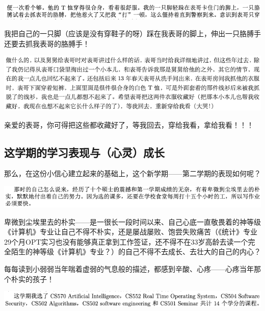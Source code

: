 \documentclass[9pt, b5paper]{article}
\begin{document}
\begin{center}
\includegraphics[width=.9\linewidth]{./pic/backups_plans_20210502_113101.png}
\end{center}

我把自己的一只脚（应该是没有穿鞋子的呀）踩在我表哥的脚上，伸出一只胳膊手还要去抓我表哥的胳膊手！

\begin{center}
\includegraphics[width=.9\linewidth]{./pic/backups_plans_20210502_104225.png}
\end{center}

亲爱的表哥，你可得把这些都收藏好了，等我回去，穿给我看，拿给我看！！！

\subsection{这学期的学习表现与（心灵）成长}
\label{sec:org8c208ae}

那么，在这份小信心建立起来的基础上，这个新学期——第二学期的表现如何呢？

\begin{center}
\includegraphics[width=.9\linewidth]{./pic/backups_plans_20210424_214439.png}
\end{center}

卑微到尘埃里去的朴实——是一很长一段时间以来、自己心底一直敬畏着的神等级《计算机》专业让自己不得不朴实，还是屡战屡败、饱尝失败痛苦（《统计》专业29个月OPT实习也没有能够真正拿到工作签证，还不得不在33岁高龄去读一个完全陌生的神等级《计算机》专业？）的自己不得不去成长、去壮大的自己的内心？

每每读到小弱弱当年喘着虚弱的气息般的描述，都感到辛酸、心疼——心疼当年那个朴实的孩子！

\begin{center}
\includegraphics[width=.9\linewidth]{./pic/backups_plans_20210504_112127.png}
\end{center}
\end{document}
